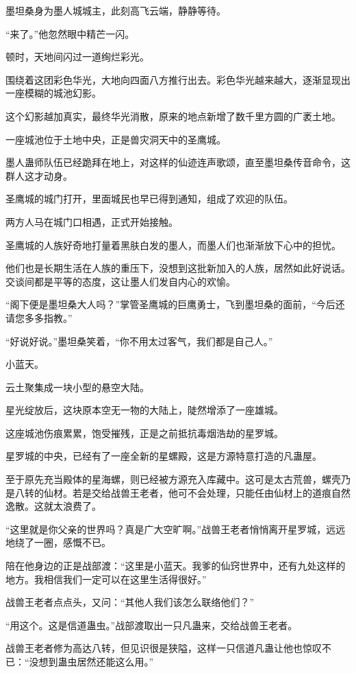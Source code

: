 \begin{this_body}
墨坦桑身为墨人城城主，此刻高飞云端，静静等待。

“来了。”他忽然眼中精芒一闪。

顿时，天地间闪过一道绚烂彩光。

围绕着这团彩色华光，大地向四面八方推行出去。彩色华光越来越大，逐渐显现出一座模糊的城池幻影。

这个幻影越加真实，最终华光消散，原来的地点新增了数千里方圆的广袤土地。

一座城池位于土地中央，正是兽灾洞天中的圣鹰城。

墨人蛊师队伍已经跪拜在地上，对这样的仙迹连声歌颂，直至墨坦桑传音命令，这群人这才动身。

圣鹰城的城门打开，里面城民也早已得到通知，组成了欢迎的队伍。

两方人马在城门口相遇，正式开始接触。

圣鹰城的人族好奇地打量着黑肤白发的墨人，而墨人们也渐渐放下心中的担忧。

他们也是长期生活在人族的重压下，没想到这批新加入的人族，居然如此好说话。交谈间都是平等的态度，这让墨人们发自内心的欢愉。

“阁下便是墨坦桑大人吗？”掌管圣鹰城的巨鹰勇士，飞到墨坦桑的面前，“今后还请您多多指教。”

“好说好说。”墨坦桑笑着，“你不用太过客气，我们都是自己人。”

小蓝天。

云土聚集成一块小型的悬空大陆。

星光绽放后，这块原本空无一物的大陆上，陡然增添了一座雄城。

这座城池伤痕累累，饱受摧残，正是之前抵抗毒烟浩劫的星罗城。

星罗城的中央，已经有了一座全新的星螺殿，这是方源特意打造的凡蛊屋。

至于原先充当殿体的星海螺，则已经被方源充入库藏中。这可是太古荒兽，螺壳乃是八转的仙材。若是交给战兽王老者，他可不会处理，只能任由仙材上的道痕自然逸散。这就太浪费了。

“这里就是你父亲的世界吗？真是广大空旷啊。”战兽王老者悄悄离开星罗城，远远地绕了一圈，感慨不已。

陪在他身边的正是战部渡：“这里是小蓝天。我爹的仙窍世界中，还有九处这样的地方。我相信我们一定可以在这里生活得很好。”

战兽王老者点点头，又问：“其他人我们该怎么联络他们？”

“用这个。这是信道蛊虫。”战部渡取出一只凡蛊来，交给战兽王老者。

战兽王老者修为高达八转，但见识很是狭隘，这样一只信道凡蛊让他也惊叹不已：“没想到蛊虫居然还能这么用。”


\end{this_body}
